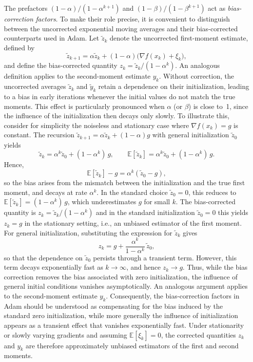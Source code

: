 \documentclass[11pt, a4paper,leqno]{amsart}
\theoremstyle{definition}
\numberwithin{equation}{section}
\begin{document}
The prefactors ${(1-\alpha)}/{(1-\alpha^{k+1})}$ and ${(1-\beta)}/{(1-\beta^{k+1})}$ act as \emph{bias-correction factors}. To make their role precise, it is convenient to distinguish between the uncorrected exponential moving averages and their bias-corrected counterparts used in Adam. Let $\tilde z_k$ denote the uncorrected first-moment estimate, defined by
\[
\tilde z_{k+1} = \alpha \tilde z_k + (1-\alpha)\bigl(\nabla f(x_k)+\xi_k\bigr),
\]
and define the bias-corrected quantity $z_k = {\tilde z_k}/{(1-\alpha^k)}$. An analogous definition applies to the second-moment estimate $y_k$. Without correction, the uncorrected averages $\tilde z_k$ and $\tilde y_k$ retain a dependence on their initialization, leading to a bias in early iterations whenever the initial values do not match the true moments. This effect is particularly pronounced when $\alpha$ (or $\beta$) is close to~1, since the influence of the initialization then decays only slowly. To illustrate this, consider for simplicity the noiseless and stationary case where $\nabla f(x_k)=g$ is constant. The recursion $\tilde z_{k+1} = \alpha \tilde z_k + (1-\alpha) g$ with general initialization $\tilde z_0$ yields
\[
\tilde z_k = \alpha^k \tilde z_0 + (1-\alpha^k)\, g,
\qquad
\mathbb{E}[\tilde z_k] = \alpha^k \tilde z_0 + (1-\alpha^k)\, g.
\]
Hence,
\[
\mathbb{E}[\tilde z_k] - g = \alpha^k (\tilde z_0 - g),
\]
so the bias arises from the mismatch between the initialization and the true first moment, and decays at rate $\alpha^k$. In the standard choice $\tilde z_0=0$, this reduces to $
\mathbb{E}[\tilde z_k]=(1-\alpha^k)\,g$, which underestimates $g$ for small $k$. The bias-corrected quantity is $z_k = {\tilde z_k}/{(1-\alpha^k)}$  and in the standard initialization $\tilde z_0=0$ this yields $z_k = g$ in the stationary setting, i.e., an unbiased estimator of the first moment. For general initialization, substituting the expression for $\tilde z_k$ gives
\[
z_k = g + \frac{\alpha^k}{1-\alpha^k}\,\tilde z_0,
\]
so that the dependence on $\tilde z_0$ persists through a transient term. However, this term decays exponentially fast as $k \to \infty$, and hence $z_k \to g$. Thus, while the bias correction removes the bias associated with zero initialization, the influence of general initial conditions vanishes asymptotically.  An analogous argument applies to the second-moment estimate $y_k$. Consequently, the bias-correction factors in Adam should be understood as compensating for the bias induced by the standard zero initialization, while more generally the influence of initialization appears as a transient effect that vanishes exponentially fast. Under stationarity or slowly varying gradients and assuming $\mathbb{E}[\xi_k]=0$, the corrected quantities $z_k$ and $y_k$ are therefore approximately unbiased estimators of the first and second moments.
\end{document}
